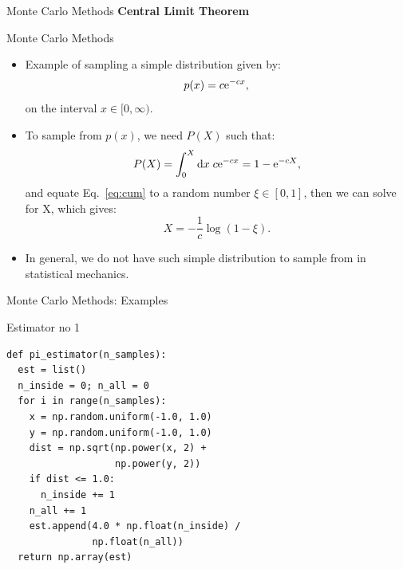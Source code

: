 \documentclass[10pt]{beamer}
\begin{document}
\begin{frame}{Monte Carlo Methods}
\textbf{Central Limit Theorem}\vspace{0.2cm}
\end{frame}

\begin{frame}{Monte Carlo Methods}
\begin{itemize}
\setlength\itemsep{1em}
  \item Example of sampling a simple distribution given by:
  \begin{equation}
    p(x) = c\mathrm{e}^{-cx},
  \end{equation}
  on the interval $x\in [0, \infty)$.

  \item To sample from $p(x)$, we need $P(X)$ such that:
  \begin{equation}
    \label{eq:cum}
    P(X) = \int_0^X \mathrm{d} x\; c\mathrm{e}^{-cx} = 1 - \mathrm{e}^{-cX},
  \end{equation}
  and equate Eq.~\ref{eq:cum} to a random number $\xi \in [0,1]$, then we can solve for X, which gives:
  \begin{equation}
    X = -\frac{1}{c}\log(1-\xi).
  \end{equation}

  \item In general, we do not have such simple distribution to sample from in statistical mechanics.
\end{itemize}
\end{frame}

\begin{frame}[fragile]{Monte Carlo Methods: Examples}
\begin{block}{Estimator no 1}
\begin{lstlisting}
def pi_estimator(n_samples):
  est = list()
  n_inside = 0; n_all = 0
  for i in range(n_samples):
    x = np.random.uniform(-1.0, 1.0)
    y = np.random.uniform(-1.0, 1.0)
    dist = np.sqrt(np.power(x, 2) +
                   np.power(y, 2))
    if dist <= 1.0:
      n_inside += 1
    n_all += 1
    est.append(4.0 * np.float(n_inside) /
               np.float(n_all))
  return np.array(est)
\end{lstlisting}
\end{block}
\end{frame}
\end{document}
